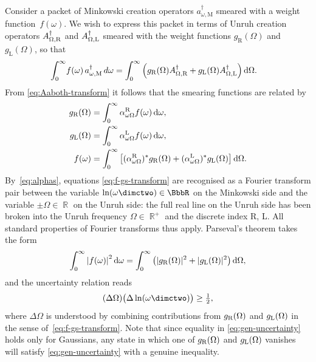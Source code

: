 Consider a packet of Minkowski creation operators $a_{\omega,\text{M}}^\dag$
smeared with a weight function~$f(\omega)$. 
We wish to express this packet in terms of
Unruh creation operators $A_{\Omega,\text{\text{R}}}^\dag$ and $A_{\Omega,\text{\text{L}}}^\dag$ 
smeared with the weight
functions $g_{\text{R}}(\Omega)$ and $g_{\text{L}}(\Omega)$, so that 
\begin{align}
\int_{0}^{\infty}
&f(\omega) \, a_{\omega,\text{M}}^\dag \, d\omega
= 
\int_0^{\infty}
\left(
g_{\text{R}}(\Omega)A_{\Omega,\text{\text{R}}}^\dag+g_{\text{L}}(\Omega) A_{\Omega,\text{\text{L}}}^\dag
\right)
\text{d}\Omega. 
\label{eq:smeared-creator}
\end{align}
From \eqref{eq:Aaboth-transform} it follows that the smearing functions are related by
\begin{align}
g_\text{\text{R}}(\Omega) &= \int_{0}^{\infty}\alpha^\text{\text{R}}_{\omega\Omega}f(\omega) \, \text{d}\omega , \nonumber \\
g_\text{\text{L}}(\Omega) &= \int_{0}^{\infty}\alpha^\text{\text{L}}_{\omega\Omega}f(\omega) \, \text{d}\omega , \notag  \\
f(\omega) &= \int_{0}^{\infty}\left[(\alpha^\text{\text{R}}_{\omega\Omega})^{\ast}g_\text{\text{R}}(\Omega) 
+(\alpha^\text{\text{L}}_{\omega\Omega})^{\ast}g_\text{\text{L}}(\Omega)\right]\text{d}\Omega . 
\label{eq:f-gs-transform}
\end{align}
By~\eqref{eq:alphas}, equations \eqref{eq:f-gs-transform}
are recognised as a Fourier transform pair between the variable $\ln
(\omega\dimctwo) \in\BbbR$ on the Minkowski side and the variable
$\pm\Omega\in\BbbR$ on the Unruh side: the full real line on the Unruh
side has been broken into the Unruh frequency $\Omega \in\BbbR^+$ and
the discrete index R, L. 
All standard properties of
Fourier transforms thus apply. 
Parseval's theorem takes the form 
\begin{align}
\int_0^\infty {|f(\omega)|}^2 \, \text{d}\omega 
= 
\int_{0}^{\infty} 
\left(|g_\text{\text{R}}(\Omega)|^2+|g_\text{\text{L}}(\Omega)|^2 \right) 
\text{d}\Omega,
\end{align}
and the uncertainty 
relation reads 
\begin{align}
\label{eq:gen-uncertainty}
(\Delta \Omega)  
\bigl(\Delta \ln(\omega\dimctwo)\bigr) \ge \tfrac12, 
\end{align}
where $\Delta \Omega$ is understood by combining contributions from
$g_\text{\text{R}}(\Omega)$ and $g_\text{\text{L}}(\Omega)$ in the sense
of~\eqref{eq:f-gs-transform}.  Note that since equality in 
\eqref{eq:gen-uncertainty} holds only for Gaussians, any state in
which one of $g_\text{\text{R}}(\Omega)$ and ${}g_\text{\text{L}}(\Omega)$ vanishes will
satisfy \eqref{eq:gen-uncertainty} with a genuine inequality.

